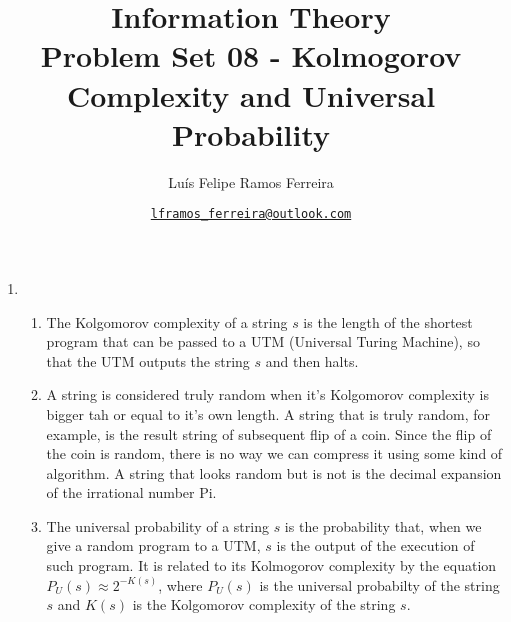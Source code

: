 \documentclass{article}
\title{Information Theory \\ \large Problem Set 08 - Kolmogorov Complexity and Universal Probability}
\author{Luís Felipe Ramos Ferreira}
\date{\href{mailto:lframos\_ferreira@outlook.com}{\texttt{lframos\_ferreira@outlook.com}}
}
\begin{document}
\maketitle

\begin{enumerate}
	\item \begin{enumerate}
		      \item The Kolgomorov complexity of a string  \(s\) is the length of the shortest program that can be passed to a UTM (Universal Turing Machine),
		            so that the UTM outputs the string \(s\) and then halts.
		      \item A string is considered truly random when it's Kolgomorov complexity is bigger tah or equal to it's own length.
		            A string that is truly random, for example, is the result string of subsequent flip of a coin. Since the flip of the coin is random, there is no way we can compress it using some kind of algorithm. A string that looks random but is not is the decimal expansion of the irrational number
		            Pi.
		      \item The universal probability of a string \(s\) is the probability that, when we give a random program to a UTM, \(s\) is the output of the execution of such program.
		            It is related to its Kolmogorov complexity by the equation \(P_U(s) \approx 2^{-K(s)}\), where \(P_U(s)\) is the universal probabilty
		            of the string \(s\) and \(K(s)\) is the Kolgomorov complexity of the string \(s\).
	      \end{enumerate}


\end{enumerate}
\end{document}
